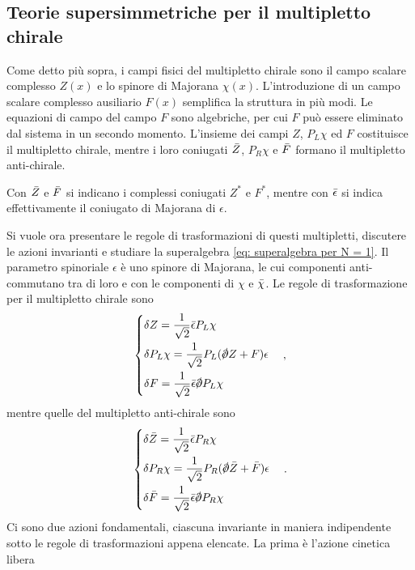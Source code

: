 \subsection{Teorie supersimmetriche per il multipletto chirale}
Come detto più sopra, i campi fisici del multipletto chirale sono il campo scalare complesso $Z(x)$ e lo spinore di Majorana $\chi(x)$. L'introduzione di un campo scalare complesso ausiliario $F(x)$ semplifica la struttura in più modi. Le equazioni di campo del campo $F$ sono algebriche, per cui $F$ può essere eliminato dal sistema in un secondo momento. L'insieme dei campi $Z$, $P_L\chi$ ed $F$ costituisce il multipletto chirale, mentre i loro coniugati $\bar{Z}$, $P_R\chi$ e $\bar{F}$ formano il multipletto anti-chirale. 
\begin{notz}
    Con $\bar{Z}$ e $\bar{F}$ si indicano i complessi coniugati $Z^*$ e $F^*$, mentre con $\bar{\epsilon}$ si indica effettivamente il coniugato di Majorana di $\epsilon$.
\end{notz}
Si vuole ora presentare le regole di trasformazioni di questi multipletti, discutere le azioni invarianti e studiare la superalgebra \eqref{eq: superalgebra per N = 1}. Il parametro spinoriale $\epsilon$ è uno spinore di Majorana, le cui componenti anti-commutano tra di loro e con le componenti di $\chi$ e $\bar{\chi}$. Le regole di trasformazione per il multipletto chirale sono
\begin{equation}
\label{eq: trasformazioni multipletto chirale}
    \begin{cases}
        \delta Z = \dfrac{1}{\sqrt{2}}\b{\epsilon}P_L\chi \\[2ex]
        \delta P_L\chi = \dfrac{1}{\sqrt{2}}P_L(\sl{\p}Z + F)\epsilon \\[2ex]
        \delta F = \dfrac{1}{\sqrt{2}}\b{\epsilon}\sl{\p}P_L\chi
    \end{cases},
\end{equation}
mentre quelle del multipletto anti-chirale sono
\begin{equation}
\label{eq: trasformazioni multipletto anti-chirale}
    \begin{cases}
        \delta \b{Z} = \dfrac{1}{\sqrt{2}}\b{\epsilon}P_R\chi \\[2ex]
        \delta P_R\chi = \dfrac{1}{\sqrt{2}}P_R(\sl{\p}\b{Z} + \b{F})\epsilon \\[2ex]
        \delta \b{F} = \dfrac{1}{\sqrt{2}}\b{\epsilon}\sl{\p}P_R\chi
    \end{cases}.
\end{equation}
Ci sono due azioni fondamentali, ciascuna invariante in maniera indipendente sotto le regole di trasformazioni appena elencate. La prima è l'azione cinetica libera
